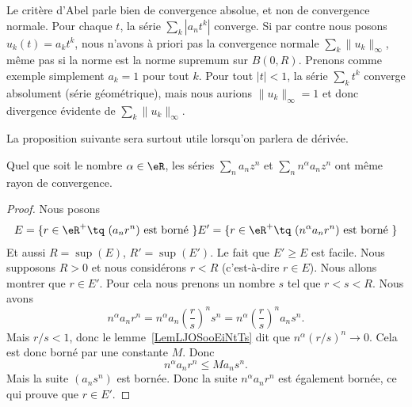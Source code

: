 Le critère d'Abel parle bien de convergence absolue, et non de convergence normale. Pour chaque \( t\), la série \( \sum_k | a_nt^k |\) converge. Si par contre nous posons \( u_k(t)=a_kt^k\), nous n'avons à priori pas la convergence normale \( \sum_k\| u_k \|_{\infty}\), même pas si la norme est la norme supremum sur \( B(0,R)\). Prenons comme exemple simplement \( a_k=1\) pour tout \( k\). Pour tout \( | t |<1\), la série \( \sum_k t^k\) converge absolument (série géométrique), mais nous aurions \( \| u_k \|_{\infty}=1\) et donc divergence évidente de \( \sum_k\| u_k \|_{\infty}\).

La proposition suivante sera surtout utile lorsqu'on parlera de dérivée.
\begin{proposition}        \label{PropHDIUooKTbVSX}
    Quel que soit le nombre \( \alpha\in \eR\), les séries \( \sum_na_nz^n\) et \( \sum_nn^{\alpha}a_nz^n\) ont même rayon de convergence.
\end{proposition}

\begin{proof}
    Nous posons
    \begin{subequations}
        \begin{align}
            E=\{ r\in \eR^+\tq \text{  } (a_nr^n)\text{ est borné } \}
            E'=\{ r\in \eR^+\tq \text{  } (n^{\alpha}a_nr^n)\text{ est borné } \}
        \end{align}
    \end{subequations}
    Et aussi \( R=\sup(E)\), \( R'=\sup(E')\). Le fait que \( E'\geq E\) est facile. Nous supposons \( R>0\) et nous considérons \( r<R\) (c'est-à-dire \( r\in E\)).  Nous allons montrer que \( r\in E'\). Pour cela nous prenons un nombre \( s\) tel que \( r<s<R\). Nous avons
    \begin{equation}
        n^{\alpha}a_nr^n=n^{\alpha}a_n\left( \frac{ r }{ s } \right)^ns^n=n^{\alpha}\left( \frac{ r }{ s } \right)^na_ns^n.
    \end{equation}
    Mais \( r/s<1\), donc le lemme~\ref{LemLJOSooEiNtTs} dit que \( n^{\alpha}(r/s)^n\to 0\). Cela est donc borné par une constante \( M\). Donc
    \begin{equation}
        n^{\alpha}a_nr^n\leq Ma_ns^n.
    \end{equation}
    Mais la suite \( (a_ns^n)\) est bornée. Donc la suite \( n^{\alpha}a_nr^n\) est également bornée, ce qui prouve que \( r\in E'\).
\end{proof}

